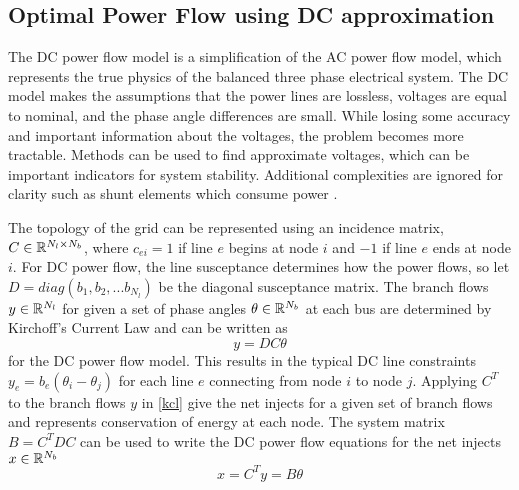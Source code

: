 \subsection{Optimal Power Flow using DC approximation} 
The DC power flow model is a simplification of the AC power flow model, which represents the true physics of the balanced three phase electrical system.  The DC model makes the assumptions that the power lines are lossless, voltages are equal to nominal, and the phase angle differences are small.  While losing some accuracy and important information about the voltages, the problem becomes more tractable.  Methods can be used to find approximate voltages, which can be important indicators for system stability.  Additional complexities are  ignored for clarity such as shunt elements which consume power \cite{matpower}.

The topology of the grid can be represented using an incidence matrix, $C \in \mathbb{R}^{N_l \times N_b}$, where $c_{ei}=1$ if line $e$ begins at node $i$ and $-1$ if line $e$ ends at node $i$.  For DC power flow, the line susceptance determines how the power flows, so let $D=diag\left(b_1,b_2,...b_{N_l}\right)$ be the diagonal susceptance matrix.  The branch flows $y \in \mathbb{R}^{N_l}$ for given a set of phase angles $\theta \in \mathbb{R}^{N_b}$ at each bus are determined by Kirchoff's Current Law and can be written as
\begin{equation}\label{kcl}
y=D C \theta
\end{equation}
for the DC power flow model.  This results in the typical DC line constraints $y_{e} = b_{e} (\theta_i - \theta_j)$ for each line $e$ connecting from node $i$ to node $j$.  Applying $C^T$ to the branch flows $y$ in \ref{kcl} give the net injects for a given set of branch flows and represents conservation of energy at each node.
  The system matrix $B = C^T D C$ can be used to write the DC power flow equations for the net injects $x \in \mathbb{R}^{N_b}$
\begin{equation}\label{dcpow}
x = C^T y = B \theta
\end{equation}

